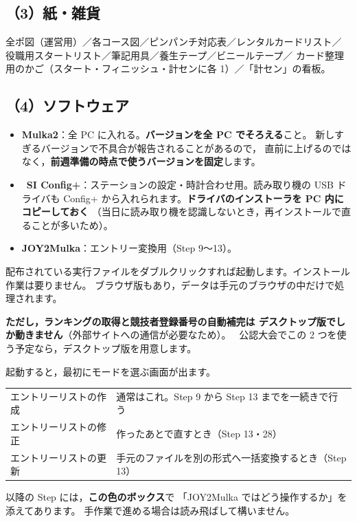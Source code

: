 \subsection*{（3）紙・雑貨}

全ポ図（運営用）／各コース図／ピンパンチ対応表／レンタルカードリスト／
役職用スタートリスト／筆記用具／養生テープ／ビニールテープ／
カード整理用のかご（スタート・フィニッシュ・計センに各 1）／「計セン」の看板。

\subsection*{（4）ソフトウェア}

\begin{itemize}
\item \textbf{Mulka2}：全 PC に入れる。\textbf{バージョンを全 PC でそろえる}こと。
      新しすぎるバージョンで不具合が報告されることがあるので，
      直前に上げるのではなく，\textbf{前週準備の時点で使うバージョンを固定}します。
\item \tSI\ \textbf{SI Config+}：ステーションの設定・時計合わせ用。読み取り機の USB ドライバも
      Config+ から入れられます。\textbf{ドライバのインストーラを PC 内にコピーしておく}
      （当日に読み取り機を認識しないとき，再インストールで直ることが多いため）。
\item \textbf{JOY2Mulka}：エントリー変換用（Step 9〜13）。
\end{itemize}

\begin{J2M}
配布されている実行ファイルをダブルクリックすれば起動します。インストール作業は要りません。
ブラウザ版もあり，データは手元のブラウザの中だけで処理されます。

\textbf{ただし，ランキングの取得と競技者登録番号の自動補完は
デスクトップ版でしか動きません}（外部サイトへの通信が必要なため）。
\tRANK\ 公認大会でこの 2 つを使う予定なら，デスクトップ版を用意します。

起動すると，最初にモードを選ぶ画面が出ます。


\begin{center}
\small
\begin{tabular}{@{}P{30mm}P{96mm}@{}}
\toprule
{} &  \\
\midrule
エントリーリストの作成 & 通常はこれ。Step 9 から Step 13 までを一続きで行う \\
エントリーリストの修正 & 作ったあとで直すとき（Step 13・28） \\
エントリーリストの更新 & 手元のファイルを別の形式へ一括変換するとき（Step 13） \\
\bottomrule
\end{tabular}
\end{center}

以降の Step には，\textbf{この色のボックス}で
「JOY2Mulka ではどう操作するか」を添えてあります。
手作業で進める場合は読み飛ばして構いません。
\end{J2M}

